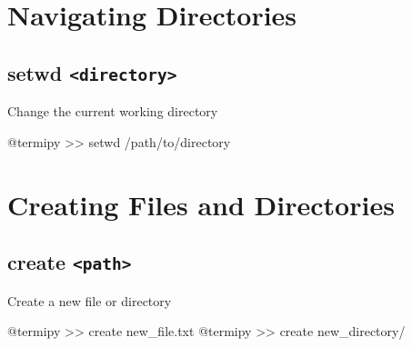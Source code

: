 \documentclass[
  letterpaper,
  DIV=11,
  numbers=noendperiod]{scrreprt}
\newenvironment{Shaded}{\begin{snugshade}}{\end{snugshade}}
\newcommand{\ExtensionTok}[1]{\textcolor[rgb]{0.00,0.23,0.31}{#1}}
\newcommand{\NormalTok}[1]{\textcolor[rgb]{0.00,0.23,0.31}{#1}}
\newcommand{\OperatorTok}[1]{\textcolor[rgb]{0.37,0.37,0.37}{#1}}
\begin{document}
\section*{Navigating Directories}\label{navigating-directories}


\subsection*{\texorpdfstring{setwd
\texttt{\textless{}directory\textgreater{}}}{setwd \textless directory\textgreater{}}}\label{setwd-directory}

Change the current working directory

\begin{Shaded}
\begin{Highlighting}[]
\ExtensionTok{@termipy} \OperatorTok{\textgreater{}\textgreater{}}\NormalTok{ setwd /path/to/directory}
\end{Highlighting}
\end{Shaded}

\section*{Creating Files and
Directories}\label{creating-files-and-directories}


\subsection*{\texorpdfstring{create
\texttt{\textless{}path\textgreater{}}}{create \textless path\textgreater{}}}\label{create-path}

Create a new file or directory

\begin{Shaded}
\begin{Highlighting}[]
\ExtensionTok{@termipy} \OperatorTok{\textgreater{}\textgreater{}}\NormalTok{ create new\_file.txt}
\ExtensionTok{@termipy} \OperatorTok{\textgreater{}\textgreater{}}\NormalTok{ create new\_directory/}
\end{Highlighting}
\end{Shaded}
\end{document}
